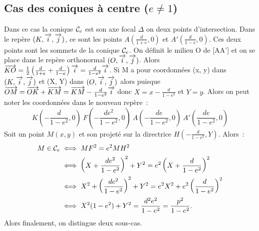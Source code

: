 \subsection{Cas des coniques à centre (\(e\neq 1\))}
Dans ce cas la conique \(\mathcal{C}_{e}\) est son axe focal \(\Delta\) on deux points
d'intersection. Dans le repère \((K, \overrightarrow{i}, \overrightarrow{j})\), ce sont les points
\(A(\frac{d}{1 + e},0)\) et \(A'(\frac{d}{1-e},0)\). Ces deux points sont les
sommets de la conique \(\mathcal{C}_{e}\). On définit le milieu O de [AA'] et on se
place dans le repère orthonormal \((O,\overrightarrow{i},\overrightarrow{j})\). Alors
\(\overrightarrow{KO} = \frac{1}{2}\left(\frac{d}{1 + e} + \frac{d}{1-e}\right)\overrightarrow{i} = \frac{d}{1-e^2}\overrightarrow{i}\).
Si M a pour coordonnées (x, y) dans \((K, \overrightarrow{i}, \overrightarrow{j})\) et (X, Y) dans \((O,\overrightarrow{i},\overrightarrow{j})\) alors
puisque \(\overrightarrow{OM} = \overrightarrow{OK} + \overrightarrow{KM} = \overrightarrow{KM}-\frac{d}{1-e^2}\overrightarrow{i}\) donc
\(X = x-\frac{d}{1-e^2}\) et \(Y = y\). Alors on peut noter les coordonnées dans le
nouveau repère~:
\begin{equation}
  K\left(-\frac{d}{1-e^2},0\right) \ F\left(-\frac{de^2}{1-e^2},0\right) \
  A\left(-\frac{de}{1-e^2},0\right) \ A'\left(\frac{de}{1-e^2},0\right)
\end{equation}
Soit un point \(M(x, y)\) et son projeté sur la directrice
\(H\left(-\frac{d}{1-e^2},Y\right)\). Alors~:
\begin{align}
  M \in \mathcal{C}_{e} &\iff MF^2 = e^2 MH^2\\
                &\iff \left(X + \frac{de^2}{1-e^2}\right)^2 + Y^2 = e^2
                \left(X + \frac{d}{1-e^2}\right)^2\\
                &\iff X^2 + \left(\frac{de^2}{1-e^2}\right)^2 + Y^2 = e^2
                X^2 + e^2\left(\frac{d}{1-e^2}\right)^2\\
                &\iff X^2(1-e^2) + Y^2 = \frac{d^2e^2}{1-e^2} = \frac{p^2}{1-e^2}.
\end{align}
Alors finalement, on distingue deux sous-cas.

